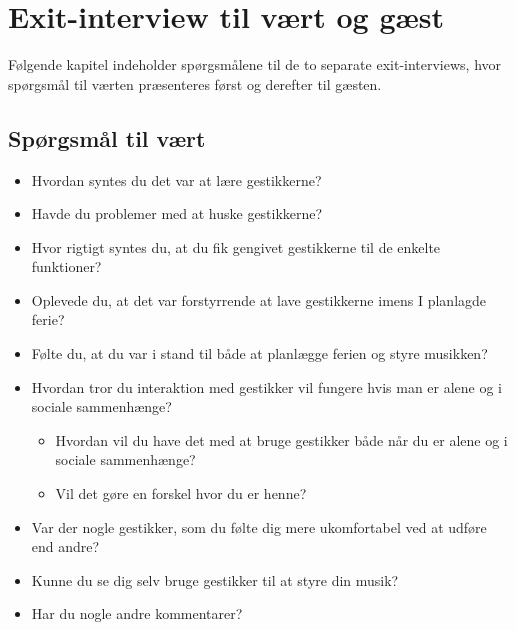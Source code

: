 \chapter{Exit-interview til vært og gæst}
\label{app:ExitInterviewSocialAccept}
%
Følgende kapitel indeholder spørgsmålene til de to separate exit-interviews, hvor spørgsmål til værten præsenteres først og derefter til gæsten. \blankline
%
\section{Spørgsmål til vært}
\label{app:ExitInterviewVaert}
%
\begin{itemize}
  \item Hvordan syntes du det var at lære gestikkerne?
  \item Havde du problemer med at huske gestikkerne?
  \item Hvor rigtigt syntes du, at du fik gengivet gestikkerne til de enkelte funktioner? 
  \item Oplevede du, at det var forstyrrende at lave gestikkerne imens I planlagde ferie? 
  \item Følte du, at du var i stand til både at planlægge ferien og styre musikken?
  \item Hvordan tror du interaktion med gestikker vil fungere hvis man er alene og i sociale sammenhænge?
  \begin{itemize}
  	\item Hvordan vil du have det med at bruge gestikker både når du er alene og i sociale sammenhænge?
  	\item Vil det gøre en forskel hvor du er henne?
  \end{itemize}  
  \item Var der nogle gestikker, som du følte dig mere ukomfortabel ved at udføre end andre? 
  \item Kunne du se dig selv bruge gestikker til at styre din musik? 
  \item Har du nogle andre kommentarer? 
\end{itemize}
%
